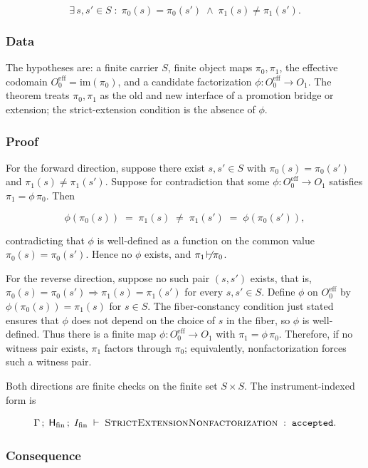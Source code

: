\documentclass[11pt]{article}
\providecommand{\factor}{\mathrel{\!\vdash\!}}
\theoremstyle{definition}
\begin{document}
\[
\exists\,s,s'\in S\;:\;\pi_0(s)=\pi_0(s')\;\wedge\;\pi_1(s)\neq\pi_1(s').
\]

\subsubsection{Data}

The hypotheses are: a finite carrier \(S\), finite object maps \(\pi_0,\pi_1\), the effective codomain \(O_0^{\mathrm{eff}}=\mathrm{im}(\pi_0)\), and a candidate factorization \(\phi:O_0^{\mathrm{eff}}\to O_1\). The theorem treats \(\pi_0,\pi_1\) as the old and new interface of a promotion bridge or extension; the strict-extension condition is the absence of \(\phi\).

\subsubsection{Proof}

For the forward direction, suppose there exist \(s,s'\in S\) with \(\pi_0(s)=\pi_0(s')\) and \(\pi_1(s)\neq\pi_1(s')\). Suppose for contradiction that some \(\phi:O_0^{\mathrm{eff}}\to O_1\) satisfies \(\pi_1=\phi\,\pi_0\). Then

\[
\phi(\pi_0(s))\;=\;\pi_1(s)\;\neq\;\pi_1(s')\;=\;\phi(\pi_0(s')),
\]

contradicting that \(\phi\) is well-defined as a function on the common value \(\pi_0(s)=\pi_0(s')\). Hence no \(\phi\) exists, and \(\pi_1\not\factor\pi_0\).

For the reverse direction, suppose no such pair \((s,s')\) exists, that is, \(\pi_0(s)=\pi_0(s')\Rightarrow\pi_1(s)=\pi_1(s')\) for every \(s,s'\in S\). Define \(\phi\) on \(O_0^{\mathrm{eff}}\) by \(\phi(\pi_0(s))=\pi_1(s)\) for \(s\in S\). The fiber-constancy condition just stated ensures that \(\phi\) does not depend on the choice of \(s\) in the fiber, so \(\phi\) is well-defined. Thus there is a finite map \(\phi:O_0^{\mathrm{eff}}\to O_1\) with \(\pi_1=\phi\,\pi_0\). Therefore, if no witness pair exists, \(\pi_1\) factors through \(\pi_0\); equivalently, nonfactorization forces such a witness pair.

Both directions are finite checks on the finite set \(S\times S\). The instrument-indexed form is

\[
\Gamma\,;\;\mathsf H_{\mathrm{fin}}\,;\;I_{\mathrm{fin}}\;\vdash\;\textsc{StrictExtensionNonfactorization}\;:\;\texttt{accepted}.
\]

\subsubsection{Consequence}
\end{document}
